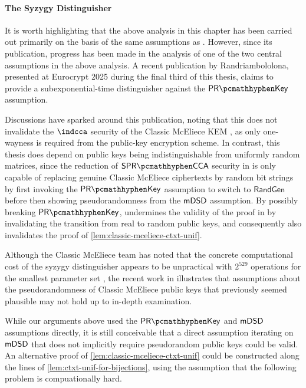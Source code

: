 \paragraph{The Syzygy Distinguisher}

It is worth highlighting that the above analysis in this chapter has been carried out primarily on the basis of the same assumptions as \cite{EC:Xagawa22}. However, since its publication, progress has been made in the analysis of one of the two central assumptions in the above analysis. A recent publication by Randriambololona, presented at Eurocrypt 2025 during the final third of this thesis, \cite{cryptoeprint:2024/1193} claims to provide a subexponential-time distinguisher against the $\prkey$ assumption.

Discussions have sparked around this publication, noting that this does not invalidate the $\indcca$ security of the Classic McEliece KEM \cite{mceliece-529-20250417}, as only one-wayness is required from the public-key encryption scheme.
In contrast, this thesis does depend on public keys being indistinguishable from uniformly random matrices, since the reduction of $\sprcca$ security in \cite{EC:Xagawa22} is only capable of replacing genuine Classic McEliece ciphertexts by random bit strings by first invoking the $\prkey$ assumption to switch to $\mathsf{RandGen}$ before then showing pseudorandomness from the $\mathsf{mDSD}$ assumption.
By possibly breaking $\prkey$, \cite{cryptoeprint:2024/1193} undermines the validity of the proof in \cite{EC:Xagawa22} by invalidating the transition from real to random public keys, and consequently also invalidates the proof of \cref{lem:classic-mceliece-ctxt-unif}.

Although the Classic McEliece team has noted that the concrete computational cost of the syzygy distinguisher appears to be unpractical with $2^{529}$ operations for the smallest parameter set \cite{mceliece-529-20250417}, the recent work in \cite{cryptoeprint:2024/1193} illustrates that assumptions about the pseudorandomness of Classic McEliece public keys that previously seemed plausible may not hold up to in-depth examination.

While our arguments above used the $\prkey$ and $\mathsf{mDSD}$ assumptions directly, it is still conceivable that a direct assumption iterating on $\mathsf{mDSD}$ that does not implicitly require pseudorandom public keys could be valid.
An alternative proof of \cref{lem:classic-mceliece-ctxt-unif} could be constructed along the lines of \cref{lem:ctxt-unif-for-bijections}, using the assumption that the following problem is compuationally hard.

